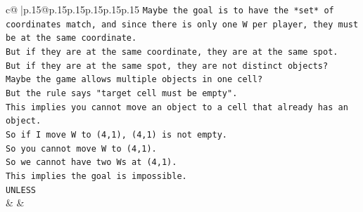\documentclass{article}
\begin{document}
{\begin{supertabular}{c@{$\;$}|p{.15\linewidth}@{}p{.15\linewidth}p{.15\linewidth}p{.15\linewidth}p{.15\linewidth}p{.15\linewidth}}
{{{\texttt{Maybe the goal is to have the *set* of coordinates match, and since there is only one W per player, they must be at the same coordinate.} \\
\texttt{But if they are at the same coordinate, they are at the same spot.} \\
\texttt{But if they are at the same spot, they are not distinct objects?} \\
\texttt{Maybe the game allows multiple objects in one cell?} \\
\texttt{But the rule says "target cell must be empty".} \\
\texttt{This implies you cannot move an object to a cell that already has an object.} \\
\texttt{So if I move W to (4,1), (4,1) is not empty.} \\
\texttt{So you cannot move W to (4,1).} \\
\texttt{So we cannot have two Ws at (4,1).} \\
\texttt{This implies the goal is impossible.} \\
\texttt{UNLESS} \\
            }
        }
    }
    & & \\ \\


\end{supertabular}}
\end{document}
